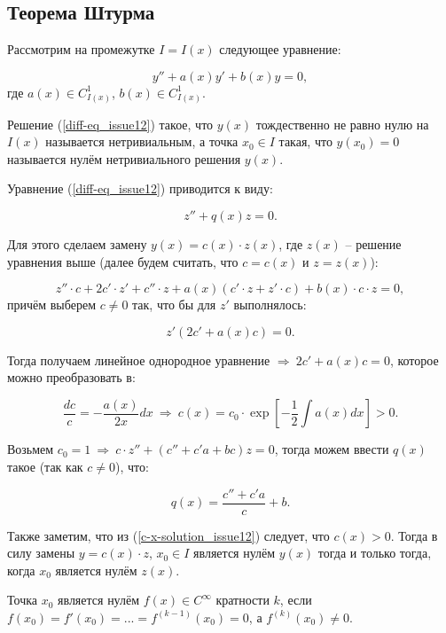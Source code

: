 \subsection{Теорема Штурма}

Рассмотрим на промежутке $I = I(x)$ следующее уравнение:

\begin{equation}\label{diff-eq_issue12}
y'' + a(x)y' + b(x)y = 0,
\end{equation}
где $a(x) \in C^1_{I(x)}$, $b(x) \in C^1_{I(x)}$.

Решение (\ref{diff-eq_issue12}) такое, что $y(x)$ тождественно не равно нулю на $I(x)$ называется нетривиальным, а точка $x_0 \in I$ такая, что $y(x_0) = 0$ называется нулём нетривиального решения $y(x)$.

Уравнение (\ref{diff-eq_issue12}) приводится к виду:

\begin{equation}\label{diff-eq_z-form_issue12}
z'' + q(x)z = 0.
\end{equation}

Для этого сделаем замену $y(x) = c(x) \cdot z(x)$, где $z(x)$ -- решение уравнения выше (далее будем считать, что $c = c(x)$ и $z = z(x)$):

\[z''\cdot c + 2c' \cdot z' + c'' \cdot z + a(x) (c' \cdot z + z' \cdot c) + b(x) \cdot c \cdot z = 0,\]
причём выберем $c \neq 0$ так, что бы для $z'$ выполнялось:

\[z' (2c' + a(x) c) = 0.\]

Тогда получаем линейное однородное уравнение $\Rightarrow \: 2c' + a(x)c = 0$, которое можно преобразовать в:

\begin{equation}\label{c-x-solution_issue12}
\frac{dc}{c} = - \frac{a(x)}{2x}dx\: \Rightarrow \: c(x) = c_0 \cdot \exp \left[-\frac{1}{2} \int a(x)dx\right] > 0.
\end{equation}

Возьмем $c_0 = 1 \: \Rightarrow \: c \cdot z'' + (c'' + c'a + bc)z = 0$, тогда можем ввести $q(x)$ такое (так как $c \neq 0$), что:

\[q(x) = \frac{c'' + c'a}{c} + b.\]

Также заметим, что из (\ref{c-x-solution_issue12}) следует, что $c(x) > 0$. Тогда в силу замены $y = c(x) \cdot z$, $x_0 \in I$ является нулём $y(x)$ тогда и только тогда, когда $x_0$ является нулём $z(x)$.

\begin{definition}
Точка $x_0$ является нулём $f(x) \in C^{\infty}$ кратности $k$, если $f(x_0) = f'(x_0) = ... = f^{(k-1)}(x_0) = 0$, а $f^{(k)}(x_0) \neq 0$.
\end{definition}

